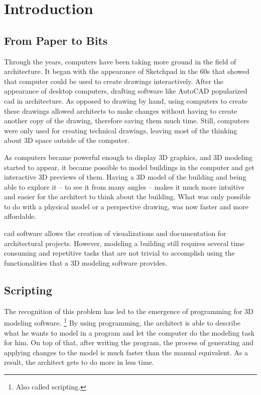 
\chapter{Introduction}
\label{chapter:introduction}


\section{From Paper to Bits}

Through the years, computers have been taking more ground in the field of architecture.
It began with the appearance of Sketchpad\cite{Sutherland:1964:SPM:800265.810742} in the 60s that showed that computer could be used to create drawings interactively.
After the appearance of desktop computers, drafting software like AutoCAD popularized \gls{cad} in architecture.
As opposed to drawing by hand, using computers to create these drawings allowed architects to make changes without having to create another copy of the drawing, therefore saving them much time.
Still, computers were only used for creating technical drawings, leaving most of the thinking about 3D space outside of the computer.

As computers became powerful enough to display 3D graphics, and 3D modeling started to appear, it became possible to model buildings in the computer and get interactive 3D previews of them.
Having a 3D model of the building and being able to explore it -- to see it from many angles -- makes it much more intuitive and easier for the architect to think about the building.
What was only possible to do with a physical model or a perspective drawing, was now faster and more affordable.

\gls{cad} software allows the creation of visualizations and documentation for architectural projects.
However, modeling a building still requires several time consuming and repetitive tasks that are not trivial to accomplish using the functionalities that a 3D modeling software provides.


\section{Scripting}
The recognition of this problem has led to the emergence of programming for 3D modeling software.%
\footnote{Also called scripting.}
By using programming, the architect is able to describe what he wants to model in a program and let the computer do the modeling task for him.
On top of that, after writing the program, the process of generating and applying changes to the model is much faster than the manual equivalent.
As a result, the architect gets to do more in less time.

